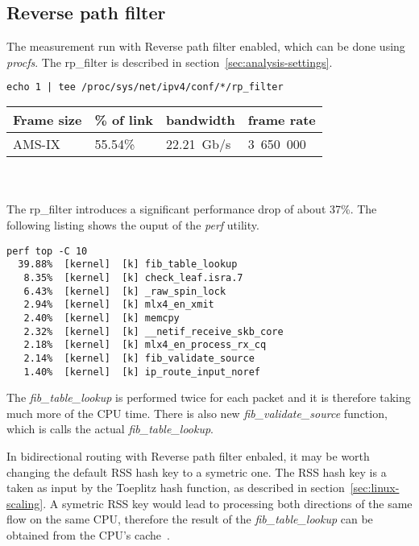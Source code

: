 
\subsection{Reverse path filter}
The measurement run with Reverse path filter enabled, which can be done using {\it{procfs}}.
The rp\_filter is described in section~\ref{sec:analysis-settings}.
\begin{lstlisting}[language=TeX]
echo 1 | tee /proc/sys/net/ipv4/conf/*/rp_filter
\end{lstlisting}


\begin{tabular}{ | l | l | l | l | }
\hline
Frame size & \% of link & bandwidth & frame rate \\
\hline
AMS-IX & 55.54\% & 22.21~Gb/s & 3~650~000 \\
\hline
\end{tabular}
\\
\\
The rp\_filter introduces a significant performance drop of about 37\%.
The following listing shows the ouput of the {\it{perf}} utility.
\begin{lstlisting}
perf top -C 10
  39.88%  [kernel]  [k] fib_table_lookup
   8.35%  [kernel]  [k] check_leaf.isra.7
   6.43%  [kernel]  [k] _raw_spin_lock
   2.94%  [kernel]  [k] mlx4_en_xmit
   2.40%  [kernel]  [k] memcpy
   2.32%  [kernel]  [k] __netif_receive_skb_core
   2.18%  [kernel]  [k] mlx4_en_process_rx_cq
   2.14%  [kernel]  [k] fib_validate_source
   1.40%  [kernel]  [k] ip_route_input_noref
\end{lstlisting}
The {\it{fib\_table\_lookup}} is performed twice for each packet
and it is therefore taking much more of the CPU time.
There is also new {\it{fib\_validate\_source}} function, which is calls
the actual {\it{fib\_table\_lookup}}.

In bidirectional routing with Reverse path filter enbaled,
it may be worth changing the default RSS hash key to a symetric one.
The RSS hash key is a taken as input by the Toeplitz hash function, as described in section~\ref{sec:linux-scaling}.
A symetric RSS key would lead to processing both directions of the same flow on the same CPU,
therefore the result of the {\it{fib\_table\_lookup}} can be obtained from the CPU's cache~\cite{symetric-rss}.
